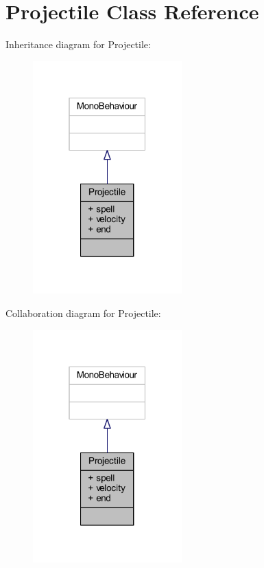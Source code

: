 \hypertarget{class_projectile}{}\section{Projectile Class Reference}
\label{class_projectile}


Inheritance diagram for Projectile\+:
\nopagebreak
\begin{figure}[H]
\begin{center}
\leavevmode
\includegraphics[width=163pt]{class_projectile__inherit__graph}
\end{center}
\end{figure}


Collaboration diagram for Projectile\+:
\nopagebreak
\begin{figure}[H]
\begin{center}
\leavevmode
\includegraphics[width=163pt]{class_projectile__coll__graph}
\end{center}
\end{figure}
